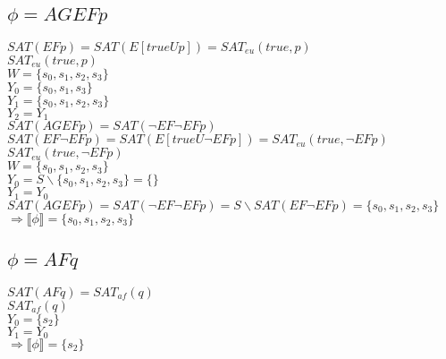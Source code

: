 \documentclass[a4paper,10pt]{article}
\begin{document}
\subsection*{$\phi = AGEFp$}
\hspace*{5mm} $SAT(EFp)=SAT(E[trueUp])=SAT_{eu}(true,p)$ 
\\[0.25cm] 
\hspace*{5mm}$SAT_{eu}(true,p)$ 
\\[0.25cm] 
\hspace*{10mm} $W = \{s_0,s_1,s_2,s_3\}$ 
\\[0.25cm] 
\hspace*{10mm} $Y_0 = \{s_0,s_1,s_3\}$ 
\\[0.25cm] 
\hspace*{10mm} $Y_1 = \{s_0,s_1,s_2,s_3\}$ 
\\[0.25cm] 
\hspace*{10mm} $Y_2 = Y_1$ 
\\[0.25cm] 
\hspace*{5mm} $SAT(AGEFp)=SAT(\neg EF \neg EF p)$ 
\\[0.25cm] 
\hspace*{5mm} $SAT(EF \neg EF p) =  SAT(E[trueU\neg EF p]) = SAT_{eu}(true,\neg EF p)$ 
\\[0.25cm] 
\hspace*{5mm} $SAT_{eu}(true,\neg EF p)$ 
\\[0.25cm] 
\hspace*{10mm} $W = \{s_0,s_1,s_2,s_3\}$ 
\\[0.25cm] 
\hspace*{10mm} $Y_0 = S \backslash \{s_0,s_1,s_2,s_3\} = \{ \}$ 
\\[0.25cm] 
\hspace*{10mm} $Y_1 = Y_0$ 
\\[0.25cm] 
\hspace*{4.9mm} $SAT(AGEFp)=SAT(\neg EF \neg EF p) = S\backslash SAT(EF \neg EF p) = \{s_0,s_1,s_2,s_3 \}$ 
\\[0.25cm] 
\hspace*{5mm} $\Rightarrow \llbracket \phi \rrbracket = \{s_0,s_1,s_2,s_3\}$

\subsection*{$\phi = AFq$}
\hspace*{5mm}$SAT(AFq) = SAT_{af}(q)$ 
\\[0.25cm] 
\hspace*{5mm}$SAT_{af}(q)$ 
\\[0.25cm] 
\hspace*{10mm}$Y_0 = \{s_2\}$
\\[0.25cm] 
\hspace*{10mm}$Y_1 = Y_0$ 
\\[0.25cm] 
\hspace*{5mm} $\Rightarrow \llbracket \phi \rrbracket = \{s_2\}$
\end{document}
